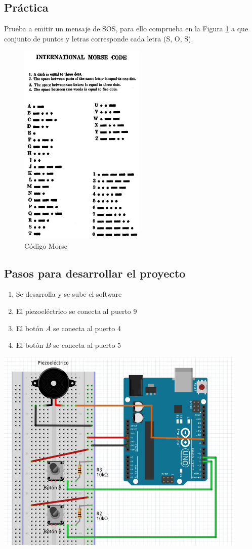 \documentclass[11pt,spanish,a4paper]{article}
\begin{document}
\subsection{Práctica} Prueba a emitir un mensaje de SOS, para ello comprueba en la Figura 
\ref{cod_morse} a que conjunto de puntos y letras corresponde cada letra (S, O, S).

\begin{figure}[H]
\centering
\includegraphics[width=6cm]{img/05.02.jpg}
\caption{Código Morse}
\label{cod_morse}
\end{figure}

\subsection*{Pasos para desarrollar el proyecto}
\begin{enumerate}
	\item Se desarrolla y se sube el software
	\item El piezoeléctrico se conecta al puerto 9
	\item El botón $A$ se conecta al puerto 4
	\item El botón $B$ se conecta al puerto 5
\end{enumerate}

\begin{center}
\includegraphics[width=12cm]{img/05.jpg}
\end{center}
\end{document}
